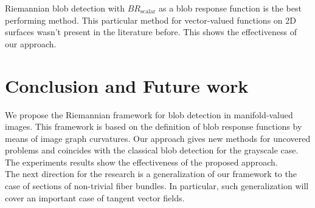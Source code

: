 \documentclass{llncs}
\newcommand{\FRScalar}{BR_{\mathrm{scalar}}}
\begin{document}
Riemannian blob detection with $\FRScalar$ as a blob response function is the best performing method. This particular method for vector-valued functions on 2D surfaces wasn't present in the literature before. This shows the effectiveness of our approach. 

\section{Conclusion and Future work}
We propose the Riemannian framework for blob detection in manifold-valued images. This framework is based on the definition of blob response functions by means of image graph curvatures. Our approach gives new methods for uncovered problems and coincides with the classical blob detection for the grayscale case. The experiments results show the effectiveness of the proposed approach.
\\
The next direction for the research is a generalization of our framework to the case of sections of non-trivial fiber bundles. In particular, such generalization will cover an important case of tangent vector fields.
\end{document}
